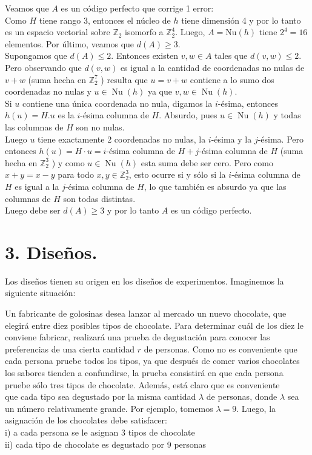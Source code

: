 \documentclass[10pt]{article}
\begin{document}
Veamos que $A$ es un código perfecto que corrige 1 error:\\
Como $H$ tiene rango 3, entonces el núcleo de $h$ tiene dimensión 4 y por lo tanto es un espacio vectorial sobre $\mathbb{Z}_{2}$ isomorfo a $\mathbb{Z}_{2}^{4}$. Luego, $A=\mathrm{Nu}(h)$ tiene $2^{4}=16$ elementos. Por último, veamos que $d(A) \geq 3$.\\
Supongamos que $d(A) \leq 2$. Entonces existen $v, w \in A$ tales que $d(v, w) \leq 2$. Pero observando que $d(v, w)$ es igual a la cantidad de coordenadas no nulas de $v+w$ (suma hecha en $\mathbb{Z}_{2}^{7}$ ) resulta que $u=v+w$ contiene a lo sumo dos coordenadas no nulas y $u \in \operatorname{Nu}(h)$ ya que $v, w \in \operatorname{Nu}(h)$.\\
Si $u$ contiene una única coordenada no nula, digamos la $i$-ésima, entonces $h(u)=H . u$ es la $i$-ésima columna de $H$. Absurdo, pues $u \in \operatorname{Nu}(h)$ y todas las columnas de $H$ son no nulas.\\
Luego $u$ tiene exactamente 2 coordenadas no nulas, la $i$-ésima y la $j$-ésima. Pero entonces $h(u)=H \cdot u=i$-ésima columna de $H+j$-ésima columna de $H$ (suma hecha en $\mathbb{Z}_{2}^{3}$ ) y como $u \in \operatorname{Nu}(h)$ esta suma debe ser cero. Pero como $x+y=x-y$ para todo $x, y \in \mathbb{Z}_{2}^{3}$, esto ocurre si y sólo si la $i$-ésima columna de $H$ es igual a la $j$-ésima columna de $H$, lo que también es absurdo ya que las columnas de $H$ son todas distintas.\\
Luego debe ser $d(A) \geq 3$ y por lo tanto $A$ es un código perfecto.

\section*{3. Diseños.}
Los diseños tienen su origen en los diseños de experimentos. Imaginemos la siguiente situación:

Un fabricante de golosinas desea lanzar al mercado un nuevo chocolate, que elegirá entre diez posibles tipos de chocolate. Para determinar cuál de los diez le conviene fabricar, realizará una prueba de degustación para conocer las preferencias de una cierta cantidad $r$ de personas. Como no es conveniente que cada persona pruebe todos los tipos, ya que después de comer varios chocolates los sabores tienden a confundirse, la prueba consistirá en que cada persona pruebe sólo tres tipos de chocolate. Además, está claro que es conveniente\\
que cada tipo sea degustado por la misma cantidad $\lambda$ de personas, donde $\lambda$ sea un número relativamente grande. Por ejemplo, tomemos $\lambda=9$. Luego, la asignación de los chocolates debe satisfacer:\\
i) a cada persona se le asignan 3 tipos de chocolate\\
ii) cada tipo de chocolate es degustado por 9 personas
\end{document}
